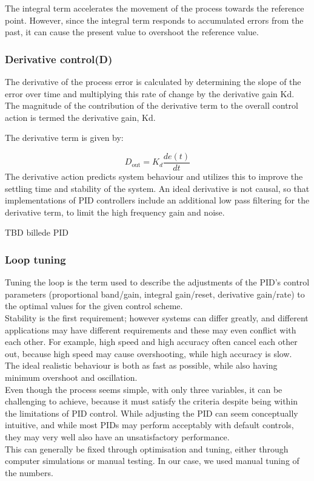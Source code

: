 The integral term accelerates the movement of the process towards the reference point.
However, since the integral term responds to accumulated errors from the past, it can cause the present value to overshoot the reference value.
\subsubsection {Derivative control(D)} 
The derivative of the process error is calculated by determining the slope of the error over time and multiplying this rate of change by the derivative gain Kd. The magnitude of the contribution of the derivative term to the overall control action is termed the derivative gain, Kd.

The derivative term is given by:

$$D_{\mathrm{out}}=K_d\frac{de(t)}{dt}$$
The derivative action predicts system behaviour and utilizes this to improve the settling time and stability of the system.
An ideal derivative is not causal, so that implementations of PID controllers include an additional low pass filtering for the derivative term, to limit the high frequency gain and noise.

TBD billede PID
\subsubsection {Loop tuning} 

Tuning the loop is the term used to describe the adjustments of the PID’s control parameters (proportional band/gain, integral gain/reset, derivative gain/rate) to the optimal values for the given control scheme. \\ Stability is the first requirement; however systems can differ greatly, and different applications may have different requirements and these may even conflict with each other. For example, high speed and high accuracy often cancel each other out, because high speed may cause overshooting, while high accuracy is slow.\\ The ideal realistic behaviour is both as fast as possible, while also having minimum overshoot and oscillation. \\ 

Even though the process seems simple, with only three variables, it can be challenging to achieve, because it must satisfy the criteria despite being within the limitations of PID control. While adjusting the PID can seem conceptually intuitive, and while most PIDs may perform acceptably with default controls, they may very well also have an unsatisfactory performance.\\ This can generally be fixed through optimisation and tuning, either through computer simulations or manual testing. In our case, we used manual tuning of the numbers.
